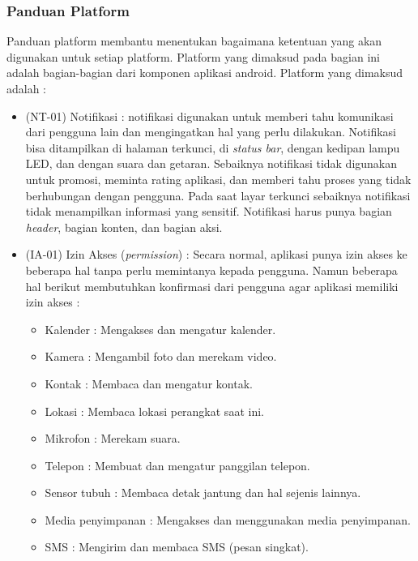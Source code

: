 \subsubsection{Panduan Platform}
Panduan platform membantu menentukan bagaimana ketentuan yang akan digunakan untuk setiap platform. Platform yang dimaksud pada bagian ini adalah bagian-bagian dari komponen aplikasi android. Platform yang dimaksud adalah :
\begin{itemize}
    \item (NT-01) Notifikasi : notifikasi digunakan untuk memberi tahu komunikasi dari pengguna lain dan mengingatkan hal yang perlu dilakukan. Notifikasi bisa ditampilkan di halaman terkunci, di \textit{status bar}, dengan kedipan lampu LED, dan dengan suara dan getaran. Sebaiknya notifikasi tidak digunakan untuk promosi, meminta rating aplikasi, dan memberi tahu proses yang tidak berhubungan dengan pengguna. Pada saat layar terkunci sebaiknya notifikasi tidak menampilkan informasi yang sensitif. Notifikasi harus punya bagian \textit{header}, bagian konten, dan bagian aksi. 
    \item (IA-01) Izin Akses (\textit{permission}) : Secara normal, aplikasi punya izin akses ke beberapa hal tanpa perlu memintanya kepada pengguna. Namun beberapa hal berikut membutuhkan konfirmasi dari pengguna agar aplikasi memiliki izin akses :
    \begin{itemize} \label{subs:izin}
        \item Kalender : Mengakses dan mengatur kalender.
        \item Kamera : Mengambil foto dan merekam video.
        \item Kontak : Membaca dan mengatur kontak.
        \item Lokasi : Membaca lokasi perangkat saat ini.
        \item Mikrofon : Merekam suara.
        \item Telepon : Membuat dan mengatur panggilan telepon.
        \item Sensor tubuh : Membaca detak jantung dan hal sejenis lainnya.
        \item Media penyimpanan : Mengakses dan menggunakan media penyimpanan.
        \item SMS : Mengirim dan membaca SMS (pesan singkat).
    \end{itemize}
\end{itemize}


